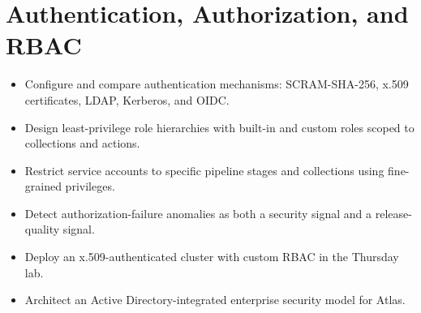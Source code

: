\chapter{Authentication, Authorization, and RBAC}
%

\begin{objectives}
\begin{itemize}
    \item Configure and compare authentication mechanisms: SCRAM-SHA-256, x.509 certificates, LDAP, Kerberos, and OIDC.
    \item Design least-privilege role hierarchies with built-in and custom roles scoped to collections and actions.
    \item Restrict service accounts to specific pipeline stages and collections using fine-grained privileges.
    \item Detect authorization-failure anomalies as both a security signal and a release-quality signal.
    \item Deploy an x.509-authenticated cluster with custom RBAC in the Thursday lab.
    \item Architect an Active Directory-integrated enterprise security model for Atlas.
\end{itemize}
\end{objectives}

